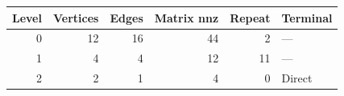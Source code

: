 \begin{tabular}{rrrrrl}
\toprule
Level & Vertices & Edges & Matrix nnz & Repeat & Terminal \\
\midrule
0 & 12 & 16 & 44 & 2 & --- \\
1 & 4 & 4 & 12 & 11 & --- \\
2 & 2 & 1 & 4 & 0 & Direct \\
\bottomrule
\end{tabular}
